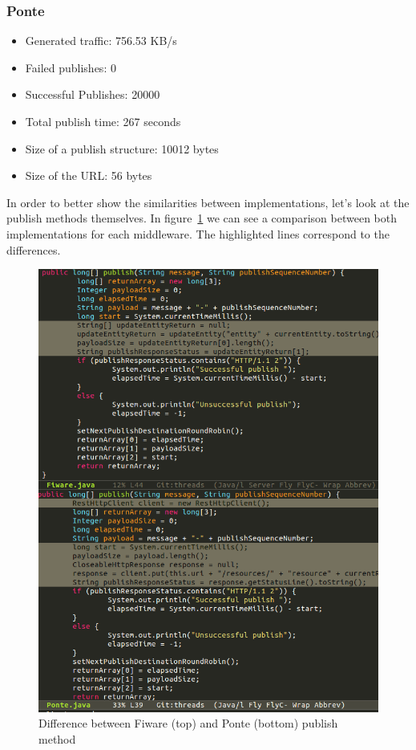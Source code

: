 \documentclass[conference]{IEEEtran}
\begin{document}
\subsubsection{Ponte}
\begin{itemize}
\item Generated traffic: 756.53 KB/s
\item Failed publishes: 0
\item Successful Publishes: 20000
\item Total publish time: 267 seconds
\item Size of a publish structure: 10012 bytes
\item Size of the URL: 56 bytes
\end{itemize}

In order to better show the similarities between implementations, let's look at the publish methods themselves. In figure~\ref{fig:fiware_ponte_diff} we can see a comparison between both implementations for each middleware. The highlighted lines correspond to the differences.

\begin{figure}[htbp!]
  \centering
  \includegraphics[width=\columnwidth]{figures/fiware_ponte_diff.png}
  \caption{Difference between Fiware (top) and Ponte (bottom) publish method}
  \label{fig:fiware_ponte_diff}
\end{figure}
\end{document}
